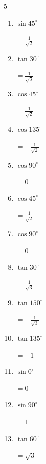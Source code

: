 \begin{multicols}{5}
\begin{enumerate}
  \item $\displaystyle \sin{45^\circ}$

        $\displaystyle =\frac{1}{\sqrt{2}}$

  \item $\displaystyle \tan{30^\circ}$

        $\displaystyle =\frac{1}{\sqrt{3}}$

  \item $\displaystyle \cos{45^\circ}$

        $\displaystyle =\frac{1}{\sqrt{2}}$

  \item $\displaystyle \cos{135^\circ}$

        $\displaystyle =-\frac{1}{\sqrt{2}}$

  \item $\displaystyle \cos{90^\circ}$

        $\displaystyle =0$

  \item $\displaystyle \cos{45^\circ}$

        $\displaystyle =\frac{1}{\sqrt{2}}$

  \item $\displaystyle \cos{90^\circ}$

        $\displaystyle =0$

  \item $\displaystyle \tan{30^\circ}$

        $\displaystyle =\frac{1}{\sqrt{3}}$

  \item $\displaystyle \tan{150^\circ}$

        $\displaystyle =-\frac{1}{\sqrt{3}}$

  \item $\displaystyle \tan{135^\circ}$

        $\displaystyle =-1$

\columnbreak %

  \item $\displaystyle \sin{0^\circ}$

        $\displaystyle =0$

  \item $\displaystyle \sin{90^\circ}$

        $\displaystyle =1$

  \item $\displaystyle \tan{60^\circ}$

        $\displaystyle =\sqrt{3}$


\end{enumerate}
\end{multicols}
